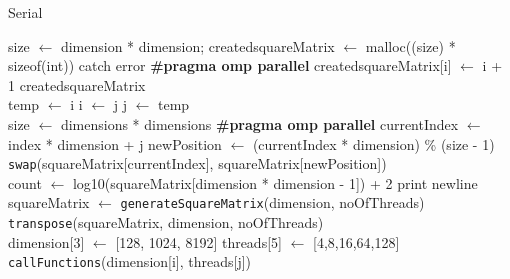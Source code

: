 \documentclass[10pt,twocolumn]{witseiepaper}
\begin{document}
\begin{appendix}
\begin{algorithm}[h!]
\begin{algorithmic}
		\caption{Serial}
		\label{alg:2}
	\end{algorithmic}
\end{algorithm}

\begin{algorithm}[htbp]
	\begin{algorithmic}
		
		\State size $\leftarrow$ dimension * dimension;
		\State created\textunderscore squareMatrix $\leftarrow$ malloc((size) * sizeof(int))
		\State catch error
		\EndIf 
		\State \textbf{\#pragma omp parallel}
		\State\hspace{\algorithmicindent}
		\State created\textunderscore squareMatrix[i] $\leftarrow$ i + 1
		\EndFor
		\EndFunction
		\State \Return created\textunderscore squareMatrix \\
		
		\State temp $\leftarrow$ i
		\State i $\leftarrow$ j
		\State j $\leftarrow$ temp
		\EndFunction \\
		
		\State size $\leftarrow$ dimensions * dimensions
		\State \textbf{\#pragma omp parallel}
		\State currentIndex $\leftarrow$ index * dimension + j
		\State newPosition $\leftarrow$ (currentIndex * dimension) \% (size - 1)
		\EndFor
		\EndFor
		\State \verb|swap|(squareMatrix[currentIndex], squareMatrix[newPosition])
		\EndFunction \\
		
		\State count $\leftarrow$ log10(squareMatrix[dimension * dimension - 1]) + 2
		\State print newline
		\EndIf
		\EndFor
		\EndFunction \\
		
		\State squareMatrix $\leftarrow$ \verb|generateSquareMatrix|(dimension, noOfThreads)
		\State \verb|transpose|(squareMatrix, dimension, noOfThreads)
		\EndFunction \\
		
		\State dimension[3] $\leftarrow$ [128, 1024, 8192]
		\State threads[5] $\leftarrow$ [4,8,16,64,128]
		\State \verb|callFunctions|(dimension[i], threads[j])
		\EndFor
		\EndFor
		\State {}
		\EndFunction
		

\end{algorithmic}
\end{algorithm}
\end{appendix}
\end{document}
